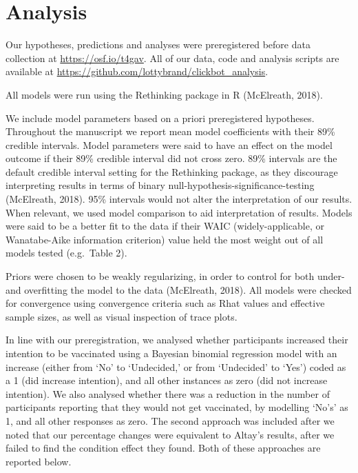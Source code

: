 \documentclass[
  english,
  ,jou,floatsintext]{apa6}
\begin{document}
\hypertarget{analysis}{%
\section{Analysis}\label{analysis}}

Our hypotheses, predictions and analyses were preregistered before data collection at \url{https://osf.io/t4gav}. All of our data, code and analysis scripts are available at \url{https://github.com/lottybrand/clickbot_analysis}.

All models were run using the Rethinking package in R (McElreath, 2018).

We include model parameters based on a priori preregistered hypotheses. Throughout the manuscript we report mean model coefficients with their 89\% credible intervals. Model parameters were said to have an effect on the model outcome if their 89\% credible interval did not cross zero. 89\% intervals are the default credible interval setting for the Rethinking package, as they discourage interpreting results in terms of binary null-hypothesis-significance-testing (McElreath, 2018). 95\% intervals would not alter the interpretation of our results. When relevant, we used model comparison to aid interpretation of results. Models were said to be a better fit to the data if their WAIC (widely-applicable, or Wanatabe-Aike information criterion) value held the most weight out of all models tested (e.g.~Table 2).

Priors were chosen to be weakly regularizing, in order to control for both under- and overfitting the model to the data (McElreath, 2018). All models were checked for convergence using convergence criteria such as Rhat values and effective sample sizes, as well as visual inspection of trace plots.

In line with our preregistration, we analysed whether participants increased their intention to be vaccinated using a Bayesian binomial regression model with an increase (either from `No' to `Undecided,' or from `Undecided' to `Yes') coded as a 1 (did increase intention), and all other instances as zero (did not increase intention). We also analysed whether there was a reduction in the number of participants reporting that they would not get vaccinated, by modelling `No's' as 1, and all other responses as zero. The second approach was included after we noted that our percentage changes were equivalent to Altay's results, after we failed to find the condition effect they found. Both of these approaches are reported below.
\end{document}
